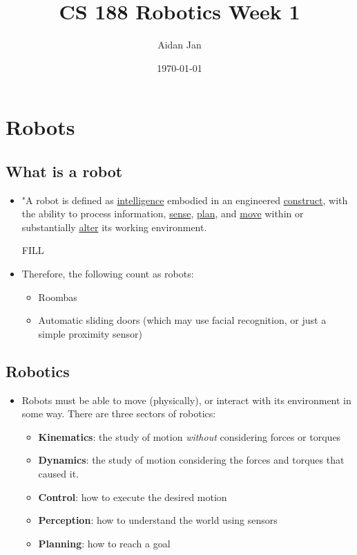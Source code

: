 \documentclass{article}
\title{CS 188 Robotics Week 1}
\author{Aidan Jan}
\date{\today}
\begin{document}
\maketitle

\section*{Robots}
\subsection*{What is a robot}
\begin{itemize}
    \item "A robot is defined as \underline{intelligence} embodied in an engineered \underline{construct}, with the ability to process information, \underline{sense}, \underline{plan}, and \underline{move} within or substantially \underline{alter} its working environment.
    \item [FILL]
    \item Therefore, the following count as robots:
    \begin{itemize}
        \item Roombas
        \item Automatic sliding doors (which may use facial recognition, or just a simple proximity sensor)
    \end{itemize}
\end{itemize}

\subsection*{Robotics}
\begin{itemize}
    \item Robots must be able to move (physically), or interact with its environment in some way.  There are three sectors of robotics:
    \begin{itemize}
        \item \textbf{Kinematics}: the study of motion \textit{without} considering forces or torques
        \item \textbf{Dynamics}: the study of motion considering the forces and torques that caused it.
        \item \textbf{Control}: how to execute the desired motion
        \item \textbf{Perception}: how to understand the world using sensors
        \item \textbf{Planning}: how to reach a goal
    \end{itemize}
\end{itemize}
\end{document}
